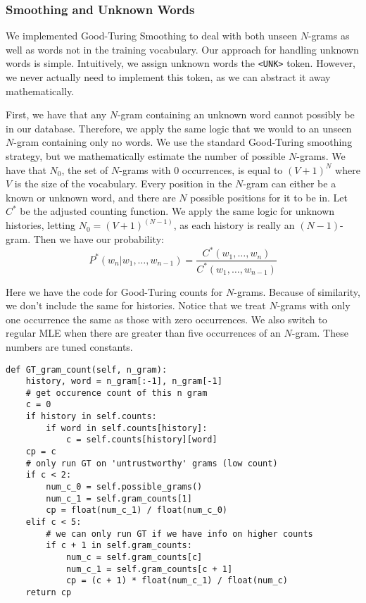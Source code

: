 \documentclass[12pt]{article}
\begin{document}
\subsubsection{Smoothing and Unknown Words}
We implemented Good-Turing Smoothing to deal with both unseen $N$-grams as well as words not in the training vocabulary. Our approach for handling unknown words is simple. Intuitively, we assign unknown words the \verb|<UNK>| token. However, we never actually need to implement this token, as we can abstract it away mathematically. 

First, we have that any $N$-gram containing an unknown word cannot possibly be in our database. Therefore, we apply the same logic that we would to an unseen $N$-gram containing only no words. We use the standard Good-Turing smoothing strategy, but we mathematically estimate the number of possible $N$-grams. We have that $N_0$, the set of $N$-grams with 0 occurrences, is equal to $(V + 1)^N$ where $V$ is the size of the vocabulary. Every position in the $N$-gram can either be a known or unknown word, and there are $N$ possible positions for it to be in. Let $C^*$ be the adjusted counting function. We apply the same logic for unknown histories, letting $N_0 =  (V + 1) ^{(N - 1)}$, as each history is really an $(N - 1)$-gram. Then we have our probability:
\[P^*(w_n | w_1, \ldots, w_{n - 1}) = \frac{C^*(w_1, \ldots, w_n)}{C^*(w_1, \ldots, w_{n - 1})}\]

Here we have the code for Good-Turing counts for $N$-grams. Because of similarity, we don't include the same for histories. Notice that we treat $N$-grams with only one occurrence the same as those with zero occurrences. We also switch to regular MLE when there are greater than five occurrences of an $N$-gram. These numbers are tuned constants.
\begin{lstlisting}
def GT_gram_count(self, n_gram):
	history, word = n_gram[:-1], n_gram[-1]
	# get occurence count of this n gram
	c = 0
	if history in self.counts:
		if word in self.counts[history]:
			c = self.counts[history][word]
	cp = c
	# only run GT on 'untrustworthy' grams (low count)
	if c < 2:
		num_c_0 = self.possible_grams()
		num_c_1 = self.gram_counts[1]
		cp = float(num_c_1) / float(num_c_0)
	elif c < 5:
		# we can only run GT if we have info on higher counts
		if c + 1 in self.gram_counts:
			num_c = self.gram_counts[c]
			num_c_1 = self.gram_counts[c + 1]
			cp = (c + 1) * float(num_c_1) / float(num_c)
	return cp
\end{lstlisting}
\end{document}
